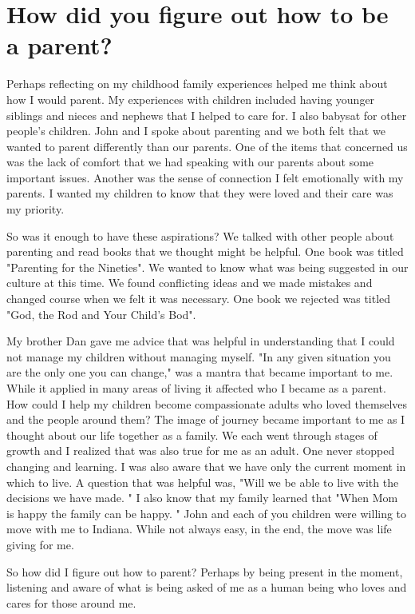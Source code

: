 \section{How did you figure out how to be a parent?}
Perhaps reflecting on my childhood family experiences helped me think about how I would parent.
My experiences with children included having younger siblings and nieces and nephews that I helped to care for.
I also babysat for other people's children.
John and I spoke about parenting and we both felt that we wanted to parent differently than our parents.
One of the items that concerned us was the lack of comfort that we had speaking with our parents about some important issues.
Another was the sense of connection I felt emotionally with my parents.
I wanted my children to know that they were loved and their care was my priority.

So was it enough to have these aspirations? We talked with other people about parenting and read books that we thought might be helpful.
One book was titled "Parenting for the Nineties".
We wanted to know what was being suggested in our culture at this time.
We found conflicting ideas and we made mistakes and changed course when we felt it was necessary.
One book we rejected was titled "God, the Rod and Your Child's Bod".

My brother Dan gave me advice that was helpful in understanding that I could not manage my children without managing myself.
"In any given situation you are the only one you can change," was a mantra that became important to me.
While it applied in many areas of living it affected who I became as a parent.
How could I help my children become compassionate adults who loved themselves and the people around them?
The image of journey became important to me as I thought about our life together as a family.
We each went through stages of growth and I realized that was also true for me as an adult.
One never stopped changing and learning.
I was also aware that we have only the current moment in which to live.
A question that was helpful was, "Will we be able to live with the decisions we have made.
" I also know that my family learned that "When Mom is happy the family can be happy.
" John and each of you children were willing to move with me to Indiana.
While not always easy, in the end, the move was life giving for me.

So how did I figure out how to parent? Perhaps by being present in the moment, listening and aware of what is being asked of me as a human being who loves and cares for those around me.





